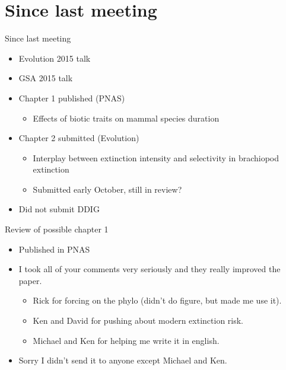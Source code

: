 \documentclass{beamer}
\title{}
\author{Peter D Smits}
\institute{Committee on Evolutionary Biology, University of Chicago}
\date{}
\begin{document}
\begin{frame}
  \tableofcontents
\end{frame}

\section{Since last meeting}
\begin{frame}
  \begin{alertblock}{Since last meeting}
    \begin{itemize}
      \item Evolution 2015 talk
      \item GSA 2015 talk
      \item Chapter 1 published (PNAS)
        \begin{itemize}
          \item Effects of biotic traits on mammal species duration
        \end{itemize}
      \item Chapter 2 submitted (Evolution)
        \begin{itemize}
          \item Interplay between extinction intensity and selectivity in brachiopod extinction
          \item Submitted early October, still in review?
        \end{itemize}
      \item Did not submit DDIG
    \end{itemize}
  \end{alertblock}
\end{frame}


\begin{frame}
  \begin{block}{Review of possible chapter 1}
    \begin{itemize}
      \item Published in PNAS
      \item I took all of your comments very seriously and they really improved the paper.
        \begin{itemize}
          \item Rick for forcing on the phylo (didn't do figure, but made me use it).
          \item Ken and David for pushing about modern extinction risk.
          \item Michael and Ken for helping me write it in english.
        \end{itemize}
      \item Sorry I didn't send it to anyone except Michael and Ken.
    \end{itemize}
  \end{block}
\end{frame}
\end{document}

